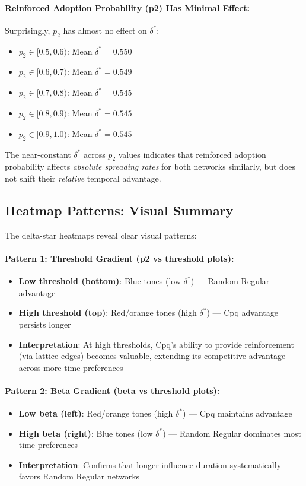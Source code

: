 \documentclass[12pt,a4paper]{article}
\begin{document}
\paragraph{Reinforced Adoption Probability (p2) Has Minimal Effect:}

Surprisingly, $p_2$ has almost no effect on $\delta^*$:
\begin{itemize}
    \item $p_2 \in [0.5, 0.6)$: Mean $\delta^* = 0.550$
    \item $p_2 \in [0.6, 0.7)$: Mean $\delta^* = 0.549$
    \item $p_2 \in [0.7, 0.8)$: Mean $\delta^* = 0.545$
    \item $p_2 \in [0.8, 0.9)$: Mean $\delta^* = 0.545$
    \item $p_2 \in [0.9, 1.0)$: Mean $\delta^* = 0.545$
\end{itemize}

The near-constant $\delta^*$ across $p_2$ values indicates that reinforced adoption probability affects \textit{absolute spreading rates} for both networks similarly, but does not shift their \textit{relative} temporal advantage.

\subsection{Heatmap Patterns: Visual Summary}

The delta-star heatmaps reveal clear visual patterns:

\paragraph{Pattern 1: Threshold Gradient (p2 vs threshold plots):}
\begin{itemize}
    \item \textbf{Low threshold (bottom)}: Blue tones (low $\delta^*$) --- Random Regular advantage
    \item \textbf{High threshold (top)}: Red/orange tones (high $\delta^*$) --- Cpq advantage persists longer
    \item \textbf{Interpretation}: At high thresholds, Cpq's ability to provide reinforcement (via lattice edges) becomes valuable, extending its competitive advantage across more time preferences
\end{itemize}

\paragraph{Pattern 2: Beta Gradient (beta vs threshold plots):}
\begin{itemize}
    \item \textbf{Low beta (left)}: Red/orange tones (high $\delta^*$) --- Cpq maintains advantage
    \item \textbf{High beta (right)}: Blue tones (low $\delta^*$) --- Random Regular dominates most time preferences
    \item \textbf{Interpretation}: Confirms that longer influence duration systematically favors Random Regular networks
\end{itemize}
\end{document}
